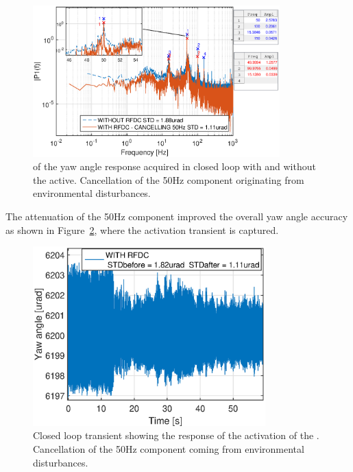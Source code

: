 \begin{figure}[h]
  \centering %
  \includegraphics[width=0.85\textwidth]{fig/matlab/fft_closedloop_50Hz}
  \caption{\label{fig:fft_closedloop_50}\abbrFFT of the yaw angle response acquired in closed loop with and without the \abbrRFDC active. Cancellation of the 50Hz component originating from environmental disturbances.}
\end{figure}
\FloatBarrier
The attenuation of the 50Hz component improved the overall yaw angle accuracy as shown in Figure~\ref{fig:transient_closedloop_50}, where the activation transient is captured.
\begin{figure}[h]
  \centering %
  \includegraphics[width=0.8\textwidth]{fig/matlab/transient_closedloop_50Hz}
  \caption{\label{fig:transient_closedloop_50}Closed loop transient showing the response of the activation of the \abbrRFDC. Cancellation of the 50Hz component coming from environmental disturbances.}
\end{figure}

